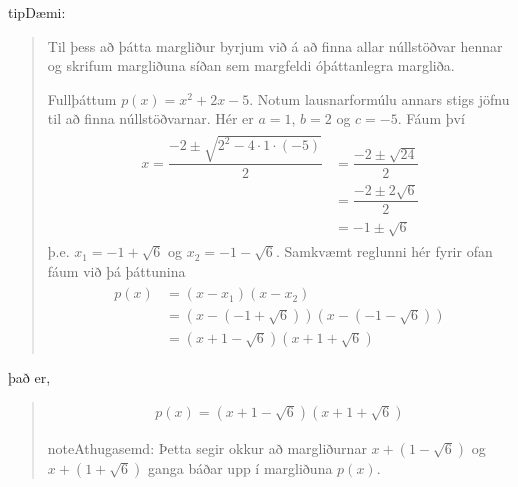 \documentclass[a4paper,10pt,icelandic]{sphinxmanual}
\begin{document}
\begin{sphinxadmonition}{tip}{Dæmi:}\begin{quote}

Til þess að þátta margliður byrjum við á að finna allar núllstöðvar hennar og skrifum margliðuna síðan sem margfeldi óþáttanlegra margliða.

Fullþáttum \(p(x)=x^2+2x-5\). Notum lausnarformúlu annars stigs jöfnu til að finna núllstöðvarnar. Hér er \(a=1\), \(b=2\) og \(c=-5\). Fáum því
\begin{equation*}
\begin{split}\begin{aligned}
x=\dfrac{-2\pm\sqrt{2^2-4\cdot 1\cdot (-5)}}{2}&=\dfrac{-2\pm\sqrt{24}}{2}\\
&=\dfrac{-2\pm 2\sqrt{6}}{2}\\
&=-1\pm\sqrt{6}
\end{aligned}\end{split}
\end{equation*}
þ.e. \(x_1=-1+\sqrt{6}\) og \(x_2=-1-\sqrt{6}\). Samkvæmt reglunni hér fyrir ofan fáum við þá þáttunina
\begin{equation*}
\begin{split}\begin{aligned}
p(x)&=(x-x_1)(x-x_2)\\
&=(x-(-1+\sqrt{6}))(x-(-1-\sqrt{6}))\\
&=(x+1-\sqrt{6})(x+1+\sqrt{6})
\end{aligned}\end{split}
\end{equation*}\end{quote}

það er,
\begin{quote}
\begin{equation*}
\begin{split}p(x)=(x+1-\sqrt{6})(x+1+\sqrt{6})\end{split}
\end{equation*}
\begin{sphinxadmonition}{note}{Athugasemd:}
Þetta segir okkur að margliðurnar \(x+(1-\sqrt{6})\) og \(x+(1+\sqrt{6})\) ganga báðar upp í margliðuna \(p(x)\).
\end{sphinxadmonition}
\end{quote}
\end{sphinxadmonition}
\label{\detokenize{Kafli06:s-daemi}}
\end{document}
